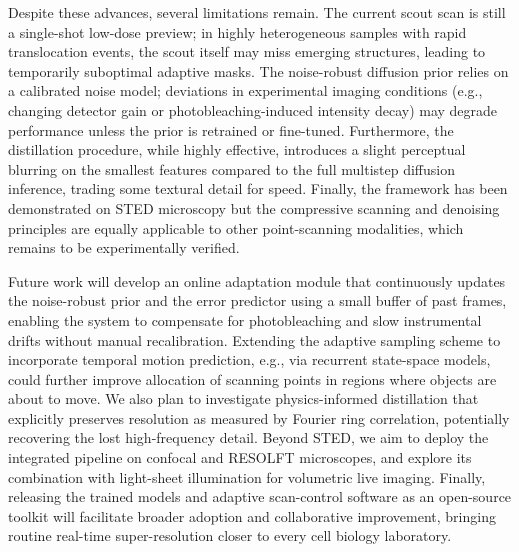 \documentclass{article}
\begin{document}
Despite these advances, several limitations remain. The current scout scan is still a single-shot low-dose preview; in highly heterogeneous samples with rapid translocation events, the scout itself may miss emerging structures, leading to temporarily suboptimal adaptive masks. The noise-robust diffusion prior relies on a calibrated noise model; deviations in experimental imaging conditions (e.g., changing detector gain or photobleaching-induced intensity decay) may degrade performance unless the prior is retrained or fine-tuned. Furthermore, the distillation procedure, while highly effective, introduces a slight perceptual blurring on the smallest features compared to the full multistep diffusion inference, trading some textural detail for speed. Finally, the framework has been demonstrated on STED microscopy but the compressive scanning and denoising principles are equally applicable to other point-scanning modalities, which remains to be experimentally verified.

Future work will develop an online adaptation module that continuously updates the noise-robust prior and the error predictor using a small buffer of past frames, enabling the system to compensate for photobleaching and slow instrumental drifts without manual recalibration. Extending the adaptive sampling scheme to incorporate temporal motion prediction, e.g., via recurrent state-space models, could further improve allocation of scanning points in regions where objects are about to move. We also plan to investigate physics-informed distillation that explicitly preserves resolution as measured by Fourier ring correlation, potentially recovering the lost high-frequency detail. Beyond STED, we aim to deploy the integrated pipeline on confocal and RESOLFT microscopes, and explore its combination with light-sheet illumination for volumetric live imaging. Finally, releasing the trained models and adaptive scan-control software as an open-source toolkit will facilitate broader adoption and collaborative improvement, bringing routine real-time super-resolution closer to every cell biology laboratory.



\end{document}
